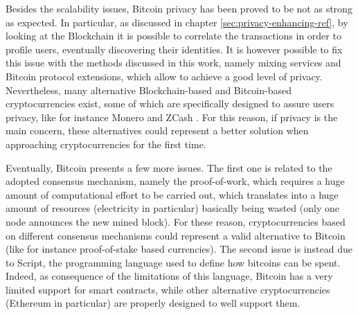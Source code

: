 Besides the scalability issues, Bitcoin privacy has been proved to be not as strong as expected. In particular, as discussed in chapter \ref{sec:privacy-enhancing-ref}, by looking at the Blockchain it is possible to correlate the transactions in order to profile users, eventually discovering their identities. It is however possible to fix this issue with the methods discussed in this work, namely mixing services and Bitcoin protocol extensions, which allow to achieve a good level of privacy. Nevertheless, many alternative Blockchain-based and Bitcoin-based cryptocurrencies exist, some of which are specifically designed to assure users privacy, like for instance Monero \cite{getmonero} and ZCash \cite{zcash}. For this reason, if privacy is the main concern, these alternatives could represent a better solution when approaching cryptocurrencies for the first time. 

Eventually, Bitcoin presents a few more issues. The first one is related to the adopted consensus mechanism, namely the proof-of-work, which requires a huge amount of computational effort to be carried out, which translates into a huge amount of resources (electricity in particular) basically being wasted (only one node announces the new mined block). For these reason, cryptocurrencies based on different consensus mechanisms could represent a valid alternative to Bitcoin (like for instance proof-of-stake based currencies). The second issue is instead due to Script, the programming language used to define how bitcoins can be spent. Indeed, as consequence of the limitations of this language, Bitcoin has a very limited support for smart contracts, while other alternative cryptocurrencies (Ethereum \cite{ethereum} in particular) are properly designed to well support them. 
